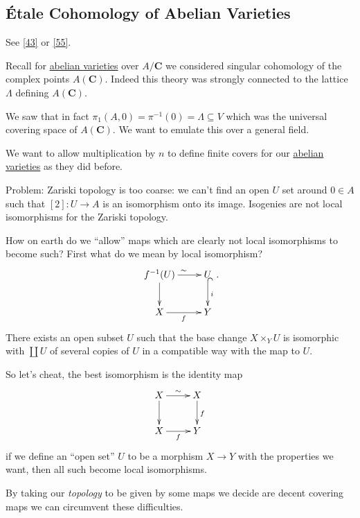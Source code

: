 \documentclass[10pt,]{book}
\numberwithin{equation}{section}
\newcommand{\lb}{[}
\newcommand{\rb}{]}
\newcommand{\CC}{\mathbf{C}}
\begin{document}
\subsection[{Étale Cohomology of Abelian Varieties}]{Étale Cohomology of Abelian Varieties}\label{subsection-26}
\hypertarget{p-262}{}%
See \hyperlink{bib-milne-etale}{[43]} or \hyperlink{bib-tamme}{[55]}.%
\par
\hypertarget{p-263}{}%
Recall for \hyperref[def-buntes-abvar]{abelian varieties} over \(A/\CC\) we considered singular cohomology of the complex points \(A(\CC)\). Indeed this theory was strongly connected to the lattice \(\Lambda\) defining \(A(\CC)\).%
\par
\hypertarget{p-264}{}%
We saw that in fact \(\pi_1(A,0) = \pi^{-1} (0) = \Lambda \subseteq V\) which was the universal covering space of \(A(\CC)\). We want to emulate this over a general field.%
\par
\hypertarget{p-265}{}%
We want to allow multiplication by \(n\) to define finite covers for our \hyperref[def-buntes-abvar]{abelian varieties} as they did before.%
\par
\hypertarget{p-266}{}%
Problem: Zariski topology is too coarse: we can't find an open \(U\) set around \(0 \in A\) such that \(\lb 2\rb \colon U \to A\) is an isomorphism onto its image. Isogenies are not local isomorphisms for the Zariski topology.%
\par
\hypertarget{p-267}{}%
How on earth do we ``allow'' maps which are clearly not local isomorphisms to become such? First what do we mean by local isomorphism?%
\begin{equation*}
\xymatrix{
f^{-1}(U)\ar[d] \ar[r]^{\sim} & U\ar@{^(->}[d]^i\\
X \ar[r]_f & Y
}\text{.}
\end{equation*}
There exists an open subset \(U\) such that the base change \(X \times_Y U\) is isomorphic with \(\coprod U\) of several copies of \(U\) in a compatible way with the map to \(U\).%
\par
\hypertarget{p-268}{}%
So let's cheat, the best isomorphism is the identity map%
\begin{equation*}
\xymatrix{
X\ar[d] \ar[r]^{\sim} & X\ar[d]^f\\
X \ar[r]_f & Y
}
\end{equation*}
if we define an ``open set'' \(U\) to be a morphism \(X \to Y\) with the properties we want, then all such become local isomorphisms.%
\par
\hypertarget{p-269}{}%
By taking our \emph{topology} to be given by some maps we decide are decent covering maps we can circumvent these difficulties.%
\end{document}
